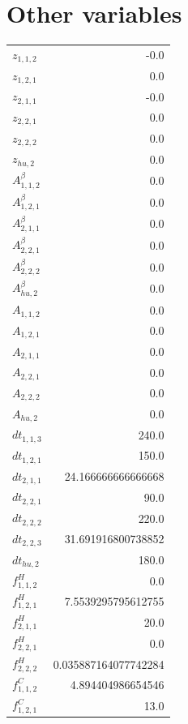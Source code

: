 \documentclass{article}%
\makeatletter
\let\mcnewpage=\newpage%
\newcommand{\TrickSupertabularIntoMulticols}{%
\renewcommand\newpage{%
\if@firstcolumn%
\hrule width\linewidth height0pt%
\columnbreak%
\else%
\mcnewpage%
\fi%
}%
}%
\makeatother
\begin{document}
\section{Other variables}%
\thispagestyle{plain}%
\begin{multicols*}{3}%
\TrickSupertabularIntoMulticols%
%
\begin{supertabular}{lr}%
	$z_{1,1,2}$ & -0.0 \\%
	$z_{1,2,1}$ & 0.0 \\%
	$z_{2,1,1}$ & -0.0 \\%
	$z_{2,2,1}$ & 0.0 \\%
	$z_{2,2,2}$ & 0.0 \\%
	$z_{hu,2}$ & 0.0 \\%
	$A_{1,1,2}^{\beta}$ & 0.0 \\%
	$A_{1,2,1}^{\beta}$ & 0.0 \\%
	$A_{2,1,1}^{\beta}$ & 0.0 \\%
	$A_{2,2,1}^{\beta}$ & 0.0 \\%
	$A_{2,2,2}^{\beta}$ & 0.0 \\%
	$A_{hu,2}^{\beta}$ & 0.0 \\%
	$A_{1,1,2}$ & 0.0 \\%
	$A_{1,2,1}$ & 0.0 \\%
	$A_{2,1,1}$ & 0.0 \\%
	$A_{2,2,1}$ & 0.0 \\%
	$A_{2,2,2}$ & 0.0 \\%
	$A_{hu,2}$ & 0.0 \\%
	$dt_{1,1,3}$ & 240.0 \\%
	$dt_{1,2,1}$ & 150.0 \\%
	$dt_{2,1,1}$ & 24.166666666666668 \\%
	$dt_{2,2,1}$ & 90.0 \\%
	$dt_{2,2,2}$ & 220.0 \\%
	$dt_{2,2,3}$ & 31.691916800738852 \\%
	$dt_{hu,2}$ & 180.0 \\%
	$f_{1,1,2}^{H}$ & 0.0 \\%
	$f_{1,2,1}^{H}$ & 7.5539295795612755 \\%
	$f_{2,1,1}^{H}$ & 20.0 \\%
	$f_{2,2,1}^{H}$ & 0.0 \\%
	$f_{2,2,2}^{H}$ & 0.035887164077742284 \\%
	$f_{1,1,2}^{C}$ & 4.894404986654546 \\%
	$f_{1,2,1}^{C}$ & 13.0 \\%

\end{supertabular}
\end{multicols*}
\end{document}
